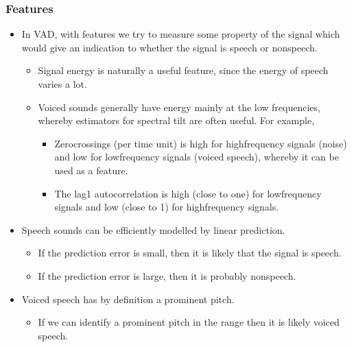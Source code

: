 \documentclass[letterpaper,10pt,english]{jupyterBook}
\begin{document}
\subsubsection{Features}
\label{\detokenize{Recognition/Voice_activity_detection:features}}
\sphinxAtStartPar
{}
\begin{itemize}
\item {} 
\sphinxAtStartPar
In VAD, with features we try to measure some property of the signal
which would give an indication to whether the signal is speech or
non\sphinxhyphen{}speech.
\begin{itemize}
\item {} 
\sphinxAtStartPar
Signal energy is naturally a useful feature, since the energy of
speech varies a lot.

\item {} 
\sphinxAtStartPar
Voiced sounds generally have energy mainly at the low
frequencies, whereby estimators for spectral tilt are often
useful. For example,
\begin{itemize}
\item {} 
\sphinxAtStartPar
Zero\sphinxhyphen{}crossings (per time unit) is high for high\sphinxhyphen{}frequency
signals (noise) and low for low\sphinxhyphen{}frequency signals (voiced
speech), whereby it can be used as a feature.

\item {} 
\sphinxAtStartPar
The lag\sphinxhyphen{}1 autocorrelation is high (close to one) for
low\sphinxhyphen{}frequency signals and low (close to \sphinxhyphen{}1) for
high\sphinxhyphen{}frequency signals.

\end{itemize}

\end{itemize}

\item {} 
\sphinxAtStartPar
Speech sounds can be efficiently modelled by linear prediction.
\begin{itemize}
\item {} 
\sphinxAtStartPar
If the prediction error is small, then it is likely that the
signal is speech.

\item {} 
\sphinxAtStartPar
If the prediction error is large, then it is probably
non\sphinxhyphen{}speech.

\end{itemize}

\item {} 
\sphinxAtStartPar
Voiced speech has by definition a prominent pitch.
\begin{itemize}
\item {} 
\sphinxAtStartPar
If we can identify a prominent pitch in the range then it is
likely voiced speech.


\end{itemize}
\end{itemize}
\end{document}

